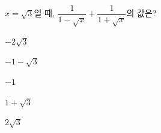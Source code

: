 \hspace*{2mm}\begin{minipage}[t]{\dimexpr\linewidth-2mm\relax}\vspace{0pt}
$x=\sqrt{3}$일 때, $\dfrac{1}{1-\sqrt{x}}+\dfrac{1}{1+\sqrt{x}}$의 값은?
\begin{choices32}{\rule[-3ex]{0pt}{8ex}$-2\sqrt{3}$}{\rule[-3ex]{0pt}{8ex}$-1-\sqrt{3}$}{\rule[-3ex]{0pt}{8ex}$-1$}{\rule[-3ex]{0pt}{8ex}$1+\sqrt{3}$}{\rule[-3ex]{0pt}{8ex}$2\sqrt{3}$}\end{choices32}\end{minipage}
